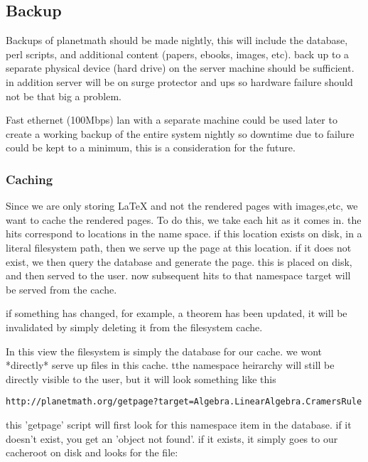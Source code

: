 

\subsection*{Backup}

Backups of planetmath should be made nightly, this will
include the database, perl scripts, and additional content
(papers, ebooks, images, etc). back up to a separate
physical device (hard drive) on the server machine should
be sufficient. in addition server will be on surge
protector and ups so hardware failure should not be that
big a problem.

Fast ethernet (100Mbps) lan with a separate machine could
be used later to create a working backup of the entire
system nightly so downtime due to failure could be kept to
a minimum, this is a consideration for the future.

\subsubsection{Caching}

Since we are only storing LaTeX and not the rendered pages
with images,etc, we want to cache the rendered pages.  To
do this, we take each hit as it comes in. the hits
correspond to locations in the name space.  if this
location exists on disk, in a literal filesystem path,
then we serve up the page at this location. if it does not
exist, we then query the database and generate the page.
this is placed on disk, and then served to the user.  now
subsequent hits to that namespace target will be served
from the cache.

if something has changed, for example, a theorem has been
updated, it will be invalidated by simply deleting it from
the filesystem cache.

In this view the filesystem is simply the database for our
cache.  we wont *directly* serve up files in this cache.
tthe namespace heirarchy will still be directly visible to
the user, but it will look something like this

\verb|http://planetmath.org/getpage?target=Algebra.LinearAlgebra.CramersRule|

this 'getpage' script will first look for this namespace
item in the database.  if it doesn't exist, you get an
'object not found'.  if it exists, it simply goes to our
cacheroot on disk and looks for the file:

